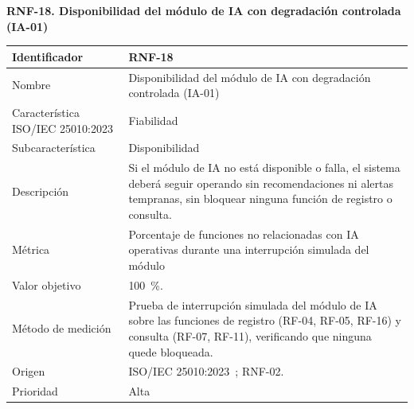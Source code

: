 \documentclass[12pt,a4paper]{article}
\begin{document}
\begin{minipage}{\linewidth}
\bigskip
\noindent\textbf{RNF-18. Disponibilidad del módulo de IA con degradación controlada (IA-01)}
\label{tab:RNF-18}

\begin{center}
\begin{tabular}{|p{4.2cm}|p{10cm}|}
\hline
Identificador & RNF-18 \\
\hline
Nombre & Disponibilidad del módulo de IA con degradación controlada (IA-01) \\
\hline
Característica ISO/IEC 25010:2023 & Fiabilidad \\
\hline
Subcaracterística & Disponibilidad \\
\hline
Descripción & Si el módulo de IA no está disponible o falla, el sistema deberá seguir operando sin recomendaciones ni alertas tempranas, sin bloquear ninguna función de registro o consulta. \\
\hline
Métrica & Porcentaje de funciones no relacionadas con IA operativas durante una interrupción simulada del módulo \\
\hline
Valor objetivo & 100~\%. \\
\hline
Método de medición & Prueba de interrupción simulada del módulo de IA sobre las funciones de registro (RF-04, RF-05, RF-16) y consulta (RF-07, RF-11), verificando que ninguna quede bloqueada. \\
\hline
Origen & ISO/IEC 25010:2023~\cite{iso25010-2023}; RNF-02. \\
\hline
Prioridad & Alta \\
\hline
\end{tabular}
\end{center}
\end{minipage}
\end{document}
